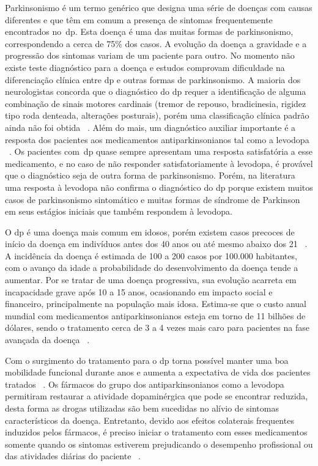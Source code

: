 Parkinsonismo é um termo genérico que designa uma série de doenças com causas diferentes e que têm em comum a presença de sintomas frequentemente encontrados no~\ac{dp}. Esta doença é uma das muitas formas de parkinsonismo, correspondendo a cerca de 75$\%$ dos casos. A evolução da doença a gravidade e a progressão dos sintomas variam de um paciente para outro. No momento não existe teste diagnóstico para a doença e estudos comprovam dificuldade na diferenciação clínica entre \ac{dp} e outras formas de parkinsonismo. A maioria dos neurologistas concorda que o diagnóstico do \ac{dp} requer a identificação de alguma combinação de sinais motores cardinais (tremor de repouso, bradicinesia, rigidez tipo roda denteada, alterações posturais), porém uma classificação clínica padrão ainda não foi obtida ~\cite{protpar010}. Além do mais, um diagnóstico auxiliar importante é a resposta dos pacientes aos medicamentos antiparkinsonianos tal como a levodopa ~\cite{protpar010}. Os pacientes com~\ac{dp} quase 
sempre apresentam uma resposta satisfatória a esse medicamento, e no caso de não responder satisfatoriamente à levodopa, é provável que o diagnóstico seja de outra forma de parkinsonismo. Porém, na literatura ~\cite{rowlandtratado} uma resposta à levodopa não confirma o diagnóstico do \ac{dp} porque existem muitos casos de parkinsonismo sintomático e muitas formas de síndrome de Parkinson em seus estágios iniciais que também respondem à levodopa. 

O \ac{dp} é uma doença mais comum em idosos, porém existem casos precoces de início da doença em indivíduos antes dos 40 anos ou até mesmo abaixo dos 21 ~\cite{menezes2003}. A incidência da doença é estimada de 100 a 200 casos por 100.000 habitantes, com o avanço da idade a probabilidade do desenvolvimento da doença tende a aumentar. Por se tratar de uma doença progressiva, sua evolução acarreta em incapacidade grave após 10 a 15 anos, ocasionando em impacto social e financeiro, principalmente na população mais idosa. Estima-se que o custo anual mundial com medicamentos antiparkinsonianos esteja em torno de 11 bilhões de dólares, sendo o tratamento cerca de 3 a 4 vezes mais caro para pacientes na fase avançada da doença ~\cite{protpar010}.

Com o surgimento do tratamento para o \ac{dp} torna possível manter uma boa mobilidade funcional durante anos e aumenta a expectativa de vida dos pacientes tratados ~\cite{abn2010}. Os fármacos do grupo dos antiparkinsonianos como a levodopa permitiram restaurar a atividade dopaminérgica que pode se encontrar reduzida, desta forma as drogas utilizadas são bem sucedidas no alívio de sintomas característicos da doença. Entretanto, devido aos efeitos colaterais frequentes induzidos pelos fármacos, é preciso iniciar o tratamento com esses medicamentos somente quando os sintomas estiverem prejudicando o desempenho profissional ou das atividades diárias do paciente ~\cite{abn2010}.

